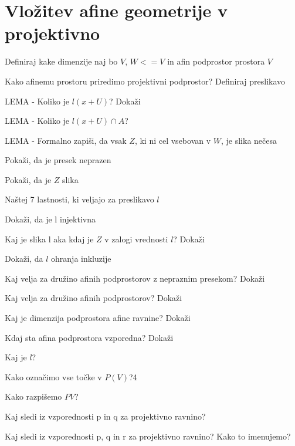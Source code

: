 \documentclass{article}
\begin{document}
    \section{Vložitev afine geometrije v projektivno}
    \begin{enumerate}
        \item Definiraj kake dimenzije naj bo $V$, $W <= V$ in afin podprostor prostora $V$
        \item Kako afinemu prostoru priredimo projektivni podprostor? Definiraj preslikavo
        {\color{blue}\item LEMA - Koliko je $l(x + U)$? Dokaži}
        {\color{blue}\item LEMA - Koliko je $l(x + U) \cap A$?}
        \item LEMA - Formalno zapiši, da vsak $Z$, ki ni cel vsebovan v $W$, je slika nečesa
        \begin{itemize}
            {\color{blue}\item Pokaži, da je presek neprazen}
            {\color{red}\item Pokaži, da je $Z$ slika}
        \end{itemize}
        \item Naštej 7 lastnosti, ki veljajo za preslikavo $l$
        {\color{red}\item Dokaži, da je l injektivna}
        {\color{red}\item Kaj je slika l aka kdaj je $Z$ v zalogi vrednosti $l$? Dokaži}
        \item Dokaži, da $l$ ohranja inkluzije
        {\color{blue}\item Kaj velja za družino afinih podprostorov z nepraznim presekom? Dokaži}
        {\color{blue}\item Kaj velja za družino afinih podprostorov? Dokaži}
        {\color{red}\item Kaj je dimenzija podprostora afine ravnine? Dokaži}
        {\color{red}\item Kdaj sta afina podprostora vzporedna? Dokaži}
        \item Kaj je $l$?
        \item Kako označimo vse točke v $P(V)$?4
        {\color{red}\item Kako razpišemo $PV$?}
        {\color{red}\item Kaj sledi iz vzporednosti p in q za projektivno ravnino?}
        {\color{red}\item Kaj sledi iz vzporednosti p, q in r za projektivno ravnino? Kako to imenujemo?}

\end{enumerate}
\end{document}
